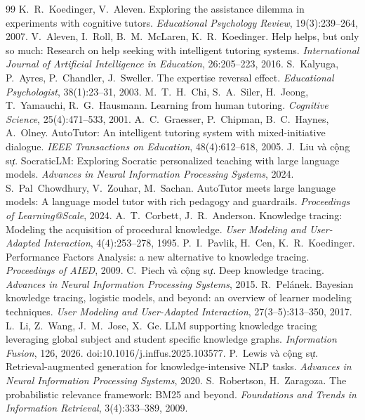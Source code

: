 \begin{thebibliography}{99}
 K.~R.~Koedinger, V.~Aleven. Exploring the assistance dilemma in experiments with cognitive tutors. \emph{Educational Psychology Review}, 19(3):239--264, 2007.
 V.~Aleven, I.~Roll, B.~M.~McLaren, K.~R.~Koedinger. Help helps, but only so much: Research on help seeking with intelligent tutoring systems. \emph{International Journal of Artificial Intelligence in Education}, 26:205--223, 2016.
 S.~Kalyuga, P.~Ayres, P.~Chandler, J.~Sweller. The expertise reversal effect. \emph{Educational Psychologist}, 38(1):23--31, 2003.
 M.~T.~H.~Chi, S.~A.~Siler, H.~Jeong, T.~Yamauchi, R.~G.~Hausmann. Learning from human tutoring. \emph{Cognitive Science}, 25(4):471--533, 2001.
 A.~C.~Graesser, P.~Chipman, B.~C.~Haynes, A.~Olney. AutoTutor: An intelligent tutoring system with mixed-initiative dialogue. \emph{IEEE Transactions on Education}, 48(4):612--618, 2005.
 J.~Liu và cộng sự. SocraticLM: Exploring Socratic personalized teaching with large language models. \emph{Advances in Neural Information Processing Systems}, 2024.
 S.~Pal~Chowdhury, V.~Zouhar, M.~Sachan. AutoTutor meets large language models: A language model tutor with rich pedagogy and guardrails. \emph{Proceedings of Learning@Scale}, 2024.
 A.~T.~Corbett, J.~R.~Anderson. Knowledge tracing: Modeling the acquisition of procedural knowledge. \emph{User Modeling and User-Adapted Interaction}, 4(4):253--278, 1995.
 P.~I.~Pavlik, H.~Cen, K.~R.~Koedinger. Performance Factors Analysis: a new alternative to knowledge tracing. \emph{Proceedings of AIED}, 2009.
 C.~Piech và cộng sự. Deep knowledge tracing. \emph{Advances in Neural Information Processing Systems}, 2015.
 R.~Pelánek. Bayesian knowledge tracing, logistic models, and beyond: an overview of learner modeling techniques. \emph{User Modeling and User-Adapted Interaction}, 27(3--5):313--350, 2017.
 L.~Li, Z.~Wang, J.~M.~Jose, X.~Ge. LLM supporting knowledge tracing leveraging global subject and student specific knowledge graphs. \emph{Information Fusion}, 126, 2026. doi:10.1016/j.inffus.2025.103577.
 P.~Lewis và cộng sự. Retrieval-augmented generation for knowledge-intensive NLP tasks. \emph{Advances in Neural Information Processing Systems}, 2020.
 S.~Robertson, H.~Zaragoza. The probabilistic relevance framework: BM25 and beyond. \emph{Foundations and Trends in Information Retrieval}, 3(4):333--389, 2009.

\end{thebibliography}

